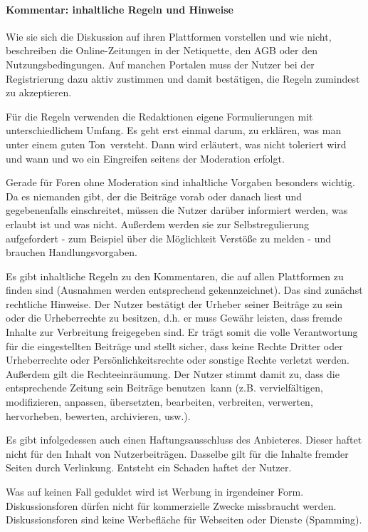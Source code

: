 \paragraph{Kommentar: inhaltliche Regeln und Hinweise}

Wie sie sich die Diskussion auf ihren Plattformen vorstellen und wie nicht,
beschreiben die Online-Zeitungen in der Netiquette, den AGB oder den
Nutzungsbedingungen. Auf manchen Portalen muss der Nutzer bei der Registrierung
dazu aktiv zustimmen und damit bestätigen, die Regeln zumindest zu akzeptieren.

Für die Regeln verwenden die Redaktionen eigene Formulierungen mit
unterschiedlichem Umfang. Es geht erst einmal darum, zu erklären, was man unter
einem \glqq guten Ton\grqq\ versteht. Dann wird erläutert, was nicht toleriert
wird und wann und wo ein Eingreifen seitens der Moderation erfolgt.

Gerade für Foren ohne Moderation sind inhaltliche Vorgaben besonders wichtig. Da
es niemanden gibt, der die Beiträge vorab oder danach liest und gegebenenfalls
einschreitet, müssen die Nutzer darüber informiert werden, was erlaubt ist und
was nicht. Außerdem werden sie zur Selbstregulierung aufgefordert - zum Beispiel
über die Möglichkeit Verstöße zu melden - und brauchen Handlungsvorgaben.

Es gibt inhaltliche Regeln zu den Kommentaren, die auf allen Plattformen zu
finden sind (Ausnahmen werden entsprechend gekennzeichnet).  Das sind zunächst
rechtliche Hinweise. Der Nutzer bestätigt der Urheber seiner Beiträge zu sein
oder die Urheberrechte zu besitzen, d.h. er muss Gewähr leisten, dass fremde
Inhalte zur Verbreitung freigegeben sind. Er trägt somit die volle Verantwortung
für die eingestellten Beiträge und stellt sicher, dass keine Rechte Dritter oder
Urheberrechte oder Persönlichkeitsrechte oder sonstige Rechte verletzt werden.
Außerdem gilt die Rechteeinräumung. Der Nutzer stimmt damit zu, dass die
entsprechende Zeitung sein Beiträge \glqq benutzen\grqq\ kann (z.B. vervielfältigen,
modifizieren, anpassen, übersetzten, bearbeiten, verbreiten, verwerten,
hervorheben, bewerten, archivieren, usw.).

Es gibt infolgedessen auch einen Haftungsausschluss des Anbieteres. Dieser
haftet nicht für den Inhalt von Nutzerbeiträgen. Dasselbe gilt für die Inhalte
fremder Seiten durch Verlinkung. Entsteht ein Schaden haftet der Nutzer.

Was auf keinen Fall geduldet wird ist Werbung in irgendeiner Form.
Diskussionsforen dürfen nicht für kommerzielle Zwecke missbraucht werden.
Diskussionsforen sind keine Werbefläche für Webseiten oder Dienste (Spamming).

